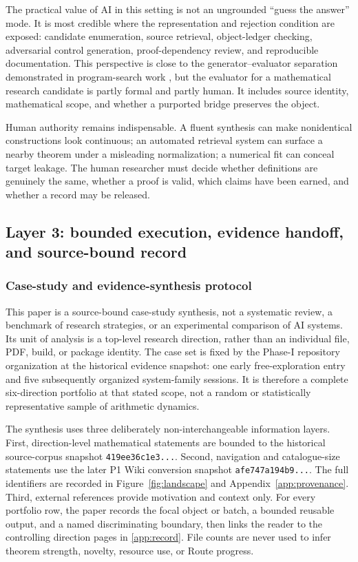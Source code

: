 The practical value of AI in this setting is not an ungrounded ``guess the
answer'' mode. It is most credible where the representation and rejection
condition are exposed: candidate enumeration, source retrieval, object-ledger
checking, adversarial control generation, proof-dependency review, and
reproducible documentation. This perspective is close to the
generator--evaluator separation demonstrated in program-search work
\citep{RomeraParedes2024}, but the evaluator for a mathematical research
candidate is partly formal and partly human. It includes source identity,
mathematical scope, and whether a purported bridge preserves the object.

Human authority remains indispensable. A fluent synthesis can make
nonidentical constructions look continuous; an automated retrieval system can
surface a nearby theorem under a misleading normalization; a numerical fit can
conceal target leakage. The human researcher must decide whether definitions
are genuinely the same, whether a proof is valid, which claims have been
earned, and whether a record may be released.

\subsection{Layer 3: bounded execution, evidence handoff, and source-bound record}
\label{sec:phase1-record}

\subsubsection{Case-study and evidence-synthesis protocol}

This paper is a source-bound case-study synthesis, not a systematic review, a
benchmark of research strategies, or an experimental comparison of AI systems.
Its unit of analysis is a top-level research direction, rather than an
individual file, PDF, build, or package identity. The case set is fixed by the
Phase-I repository organization at the historical evidence snapshot: one early
free-exploration entry and five subsequently organized system-family sessions.
It is therefore a complete six-direction portfolio at that stated scope, not a
random or statistically representative sample of arithmetic dynamics.

The synthesis uses three deliberately non-interchangeable information layers.
First, direction-level mathematical statements are bounded to the historical
source-corpus snapshot \texttt{419ee36c1e3...}. Second, navigation and
catalogue-size statements use the later P1 Wiki conversion snapshot
\texttt{afe747a194b9...}. The full identifiers are recorded in
Figure~\ref{fig:landscape} and Appendix~\ref{app:provenance}. Third, external references provide
motivation and context only. For every portfolio row, the paper records the
focal object or batch, a bounded reusable output, and a named discriminating
boundary, then links the reader to the controlling direction pages in
\cref{app:record}. File counts are never used to infer theorem strength,
novelty, resource use, or Route progress.

